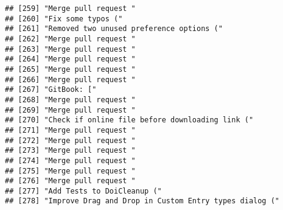 \documentclass[
]{article}
\begin{document}
\begin{verbatim}
## [259] "Merge pull request "                                                                                                        
## [260] "Fix some typos ("                                                                                                           
## [261] "Removed two unused preference options ("                                                                                    
## [262] "Merge pull request "                                                                                                        
## [263] "Merge pull request "                                                                                                        
## [264] "Merge pull request "                                                                                                        
## [265] "Merge pull request "                                                                                                        
## [266] "Merge pull request "                                                                                                        
## [267] "GitBook: ["                                                                                                                 
## [268] "Merge pull request "                                                                                                        
## [269] "Merge pull request "                                                                                                        
## [270] "Check if online file before downloading link ("                                                                             
## [271] "Merge pull request "                                                                                                        
## [272] "Merge pull request "                                                                                                        
## [273] "Merge pull request "                                                                                                        
## [274] "Merge pull request "                                                                                                        
## [275] "Merge pull request "                                                                                                        
## [276] "Merge pull request "                                                                                                        
## [277] "Add Tests to DoiCleanup ("                                                                                                  
## [278] "Improve Drag and Drop in Custom Entry types dialog ("                                                                       

\end{verbatim}
\end{document}
